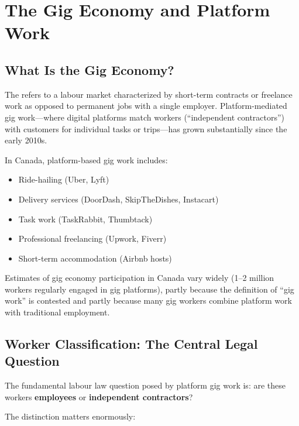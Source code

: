 \section{The Gig Economy and Platform Work}

\subsection{What Is the Gig Economy?}

The  refers to a labour market characterized by short-term contracts or freelance work as opposed to permanent jobs with a single employer. Platform-mediated gig work---where digital platforms match workers (``independent contractors'') with customers for individual tasks or trips---has grown substantially since the early 2010s.

In Canada, platform-based gig work includes:
\begin{itemize}
  \item Ride-hailing (Uber, Lyft)
  \item Delivery services (DoorDash, SkipTheDishes, Instacart)
  \item Task work (TaskRabbit, Thumbtack)
  \item Professional freelancing (Upwork, Fiverr)
  \item Short-term accommodation (Airbnb hosts)
\end{itemize}

Estimates of gig economy participation in Canada vary widely (1--2 million workers regularly engaged in gig platforms), partly because the definition of ``gig work'' is contested and partly because many gig workers combine platform work with traditional employment.

\subsection{Worker Classification: The Central Legal Question}

The fundamental labour law question posed by platform gig work is: are these workers \textbf{employees} or \textbf{independent contractors}?

The distinction matters enormously:

